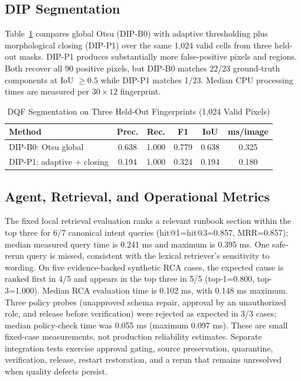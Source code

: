 \documentclass[conference]{IEEEtran}
\begin{document}
\subsection{DIP Segmentation}
Table~\ref{tab:dip} compares global Otsu (DIP-B0) with adaptive thresholding plus morphological closing (DIP-P1) over the same 1,024 valid cells from three held-out masks. DIP-P1 produces substantially more false-positive pixels and regions. Both recover all 90 positive pixels, but DIP-B0 matches 22/23 ground-truth components at IoU $\geq0.5$ while DIP-P1 matches 1/23. Median CPU processing times are measured per $30\times12$ fingerprint.

\begin{table}[t]
\caption{DQF Segmentation on Three Held-Out Fingerprints (1,024 Valid Pixels)}
\label{tab:dip}
\centering
\footnotesize
\begin{tabular}{@{}lccccc@{}}
\toprule
\textbf{Method} & \textbf{Prec.} & \textbf{Rec.} & \textbf{F1} & \textbf{IoU} & \textbf{ms/image}\\
\midrule
DIP-B0: Otsu global & 0.638 & 1.000 & 0.779 & 0.638 & 0.325\\
DIP-P1: adaptive + closing & 0.194 & 1.000 & 0.324 & 0.194 & 0.180\\
\bottomrule
\end{tabular}
\end{table}

\subsection{Agent, Retrieval, and Operational Metrics}
The fixed local retrieval evaluation ranks a relevant runbook section within the top three for 6/7 canonical intent queries (hit@1=hit@3=0.857, MRR=0.857); median measured query time is 0.241 ms and maximum is 0.395 ms. One safe-rerun query is missed, consistent with the lexical retriever's sensitivity to wording. On five evidence-backed synthetic RCA cases, the expected cause is ranked first in 4/5 and appears in the top three in 5/5 (top-1=0.800, top-3=1.000). Median RCA evaluation time is 0.102 ms, with 0.148 ms maximum. Three policy probes (unapproved schema repair, approval by an unauthorized role, and release before verification) were rejected as expected in 3/3 cases; median policy-check time was 0.055 ms (maximum 0.097 ms). These are small fixed-case measurements, not production reliability estimates. Separate integration tests exercise approval gating, source preservation, quarantine, verification, release, restart restoration, and a rerun that remains unresolved when quality defects persist.
\end{document}
